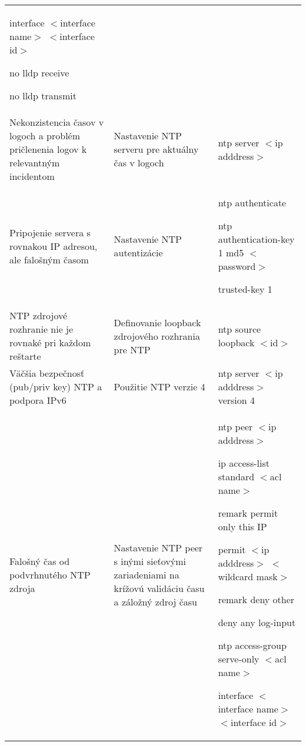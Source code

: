 \begin{longtable}[!htbp]{|L{10em}L{10em}>{\selectfont}L{34em}|}
	interface $<$interface name$>$ $<$interface id$>$	
	
	\hspace{0.5em}no lldp receive 
	
	\hspace{0.5em}no lldp transmit\\
	
	
	
	
	Nekonzistencia časov v logoch a problém pričlenenia logov k relevantným incidentom	&Nastavenie NTP serveru pre aktuálny čas v logoch	&ntp server $<$ip adddress$>$\\
	
	
	
	
	 Pripojenie servera s rovnakou IP adresou, ale falošným časom	&Nastavenie NTP autentizácie	&ntp authenticate
	
	ntp authentication-key 1 md5 $<$password$>$
	
	trusted-key 1\\
	
	
	
	
	NTP zdrojové rozhranie nie je rovnaké pri každom reštarte	& Definovanie loopback zdrojového rozhrania pre NTP	&ntp source loopback $<$id$>$\\
	
	
	
	
	Väčšia bezpečnosť (pub/priv key) NTP a podpora IPv6	&Použitie NTP verzie 4	&ntp server $<$ip adddress$>$ version 4\\
	
	
	
	Falošný čas od podvrhnutého NTP zdroja	&Nastavenie NTP peer s inými sieťovými zariadeniami na krížovú validáciu času a záložný zdroj času	&ntp peer $<$ip adddress$>$
	
	ip access-list standard $<$acl name$>$
	
	\hspace{0.5em}remark permit only this IP 
	
	\hspace{0.5em}permit $<$ip adddress$>$ $<$wildcard mask$>$
	
	\hspace{0.5em}remark deny other 
	
	\hspace{0.5em}deny any log-input
	
	ntp access-group serve-only $<$acl name$>$
	
	interface $<$interface name$>$ $<$interface id$>$
	

\end{longtable}
